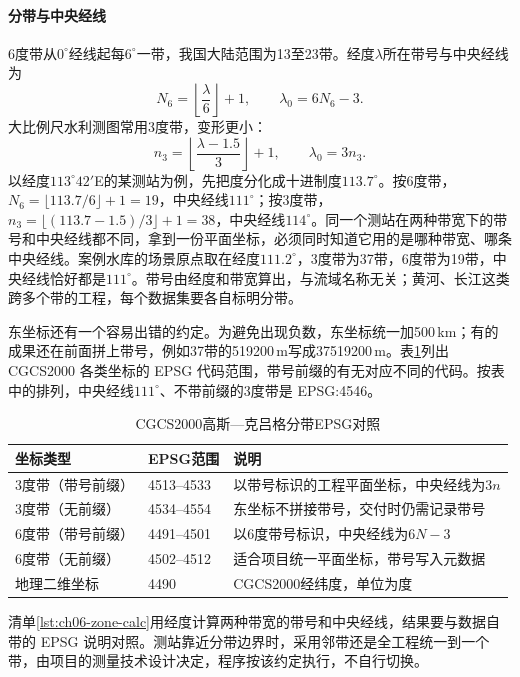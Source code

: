 \paragraph{分带与中央经线}6度带从$0^\circ$经线起每$6^\circ$一带，我国大陆范围为13至23带。经度$\lambda$所在带号与中央经线为
\[
  N_6=\left\lfloor\frac{\lambda}{6}\right\rfloor+1,
  \qquad \lambda_0=6N_6-3 .
\]
大比例尺水利测图常用3度带，变形更小：
\[
  n_3=\left\lfloor\frac{\lambda-1.5}{3}\right\rfloor+1,
  \qquad \lambda_0=3n_3 .
\]
以经度$113^\circ42'$E的某测站为例，先把度分化成十进制度$113.7^\circ$。按6度带，$N_6=\lfloor113.7/6\rfloor+1=19$，中央经线$111^\circ$；按3度带，$n_3=\lfloor(113.7-1.5)/3\rfloor+1=38$，中央经线$114^\circ$。同一个测站在两种带宽下的带号和中央经线都不同，拿到一份平面坐标，必须同时知道它用的是哪种带宽、哪条中央经线。案例水库的场景原点取在经度$111.2^\circ$，3度带为37带，6度带为19带，中央经线恰好都是$111^\circ$。带号由经度和带宽算出，与流域名称无关；黄河、长江这类跨多个带的工程，每个数据集要各自标明分带。

东坐标还有一个容易出错的约定。为避免出现负数，东坐标统一加500\,km；有的成果还在前面拼上带号，例如37带的519200\,m写成37519200\,m。表\ref{tab:ch06-cgcs-epsg}列出 CGCS2000 各类坐标的 EPSG 代码范围，带号前缀的有无对应不同的代码。按表中的排列，中央经线$111^\circ$、不带前缀的3度带是 EPSG:4546。

\begin{table}[htbp]
\centering
\caption{CGCS2000高斯—克吕格分带EPSG对照}
\label{tab:ch06-cgcs-epsg}
\begin{tabular}{p{}p{}p{}}
\hline
坐标类型 & EPSG范围 & 说明 \\
\hline
3度带（带号前缀） & 4513--4533 & 以带号标识的工程平面坐标，中央经线为$3n$ \\
3度带（无前缀） & 4534--4554 & 东坐标不拼接带号，交付时仍需记录带号 \\
6度带（带号前缀） & 4491--4501 & 以6度带号标识，中央经线为$6N-3$ \\
6度带（无前缀） & 4502--4512 & 适合项目统一平面坐标，带号写入元数据 \\
地理二维坐标 & 4490 & CGCS2000经纬度，单位为度 \\
\hline
\end{tabular}
\end{table}

清单\ref{lst:ch06-zone-calc}用经度计算两种带宽的带号和中央经线，结果要与数据自带的 EPSG 说明对照。测站靠近分带边界时，采用邻带还是全工程统一到一个带，由项目的测量技术设计决定，程序按该约定执行，不自行切换。

